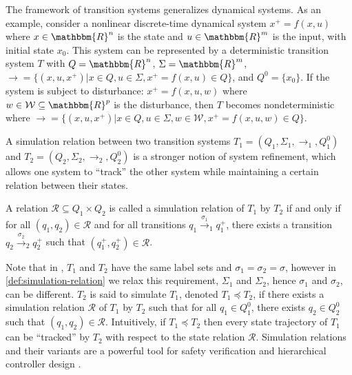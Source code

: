 \begin{example}
  The framework of transition systems generalizes dynamical systems. As an
  example, consider a nonlinear discrete-time dynamical system $x^+ = f (x,
  u)$ where $x \in \mathbbm{R}^n$ is the state and $u \in \mathbbm{R}^m$ is
  the input, with initial state $x_{0}$.
  This system can be represented by a deterministic transition
  system $T$ with $Q =\mathbbm{R}^n$, $\Sigma =\mathbbm{R}^m$,
  $\rightarrow = \{ (x, u, x^+) |x \in Q, u \in \Sigma, x^+ = f (x, u) \in Q
  \}$, and $Q^{0} = \{x_{0}\}$.
  If the system is subject to disturbance: $x^+ = f (x, u, w)$ where
  $w \in \mathcal{W} \subseteq \mathbbm{R}^p$ is the disturbance, then $T$
  becomes nondeterministic where $\rightarrow = \{ (x, u, x^+) |x \in Q, u \in
  \Sigma, w \in \mathcal{W}, x^+ = f (x, u, w) \in Q \}$.
\end{example}

A simulation relation between two transition systems $T_1 = (Q_1, \Sigma_1,
\rightarrow_1, Q^0_1)$ and $T_2 = (Q_2, \Sigma_2, \rightarrow_2, Q^0_2)$ is a
stronger notion of system refinement, which allows one system to ``track'' the
other system while maintaining a certain relation between their states.

\begin{definition}[Simulation]
  \label{def:simulation-relation}A relation $\mathcal{R} \subseteq Q_1 \times
  Q_2$ is called a simulation relation of $T_1$ by $T_2$ if and only if for all $(q_1,
  q_2) \in \mathcal{R}$ and for all transitions $q_1 \xrightarrow{\sigma_1}_{1}
  q^+_1$, there exists a transition $q_2 \xrightarrow{\sigma_2}_{2}
  q^+_2$ such that $(q_1^+, q_2^+) \in \mathcal{R}$.
\end{definition}

Note that in \cite{girardetal07amd}, %
$T_1$ and $T_2$ have the same
label sets and $\sigma_{1} = \sigma_2 = \sigma$, %
however in \cref{def:simulation-relation} we %
relax this requirement, \ie $\Sigma_1$ and $\Sigma_2$, hence $\sigma_{1}$ and $\sigma_{2}$, can be different.
$T_2$ is said to simulate $T_1$, denoted $T_1 \preceq T_2$, if there exists a
simulation relation $\mathcal{R}$ of $T_1$ by $T_2$ such that for all $q_1 \in
Q^0_1$, there exists $q_2 \in Q^0_2$ such that $(q_1, q_2) \in \mathcal{R}$.
Intuitively, if $T_1 \preceq T_2$ then every state trajectory of $T_1$ can be
``tracked'' by $T_2$ with respect to the state relation $\mathcal{R}$.
Simulation relations and their variants are a powerful tool for safety verification and
hierarchical controller design \cite{clarkeetal99m,pappasetal00hcc,GirardEtAl06vus,girardetal07amd}.

